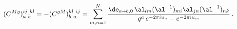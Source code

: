 \begin{equation}
(C^{Mg})^{ij~kl}_{a~b}= -
(C^{gM})^{kl~ij}_{b~a}=\sum_{m,n=1}^N
\frac{\de_{a+b,0}\,\al_{lm}
(\al^{-1})_{mi}\al_{jn}(\al^{-1})_{nk}}{q^a\,e^{-2\pi iu_n}-e^{-2\pi i u_m}}\,.
\label{InV}
\end{equation}

